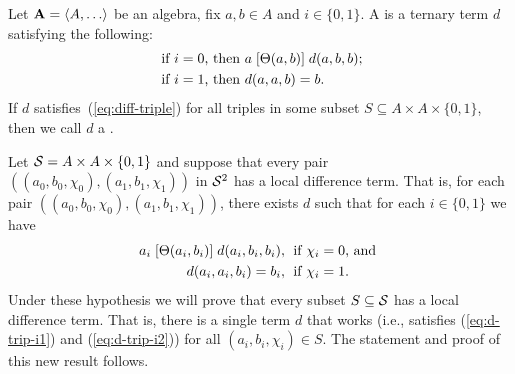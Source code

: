 Let $\bA=\< A, \dots\>$ be an algebra, fix $a, b \in A$ and
$i \in \{0,1\}$.
A  is a ternary term $d$ satisfying the following:
\begin{align}
\text{ if $i=0$, then } & a \mathrel{[\Theta(a,b)]} d(a,b,b); \label{eq:diff-triple}\\
\text{ if $i=1$, then } &d(a,a,b) = b. \nonumber
\end{align}
If $d$ satisfies~(\ref{eq:diff-triple}) for all triples
in some subset $S\subseteq A \times A \times \{0,1\}$, then we call $d$
a .

Let 
$\mathcal{S} = A \times A \times \{0,1\}$ and
suppose that every pair
$((a_0, b_0, \chi_0), (a_1, b_1, \chi_1))$
in $\mathcal{S}^2$ has a local difference term.
That is, for each pair $((a_0, b_0, \chi_0), (a_1, b_1, \chi_1))$, there exists
$d$ such that for each $i \in \{0,1\}$ we have
\begin{align}
  a_i \Comr{\Cg(a_i,b_i)} d(a_i,b_i,b_i), & \;
  \text{ if $\chi_i=0$, and }  \label{eq:d-trip-i1}\\
  d(a_i,a_i,b_i) =b_i, & \;
  \text{ if $\chi_i=1$.}\label{eq:d-trip-i2} %
\end{align}
Under these hypothesis we will prove that every subset $S\subseteq \mathcal{S}$
has a local difference term.
That is, there is a single term $d$ that works (i.e., satisfies
(\ref{eq:d-trip-i1}) and (\ref{eq:d-trip-i2})) for all $(a_i, b_i, \chi_i) \in S$.
The statement and proof of this new result follows.

